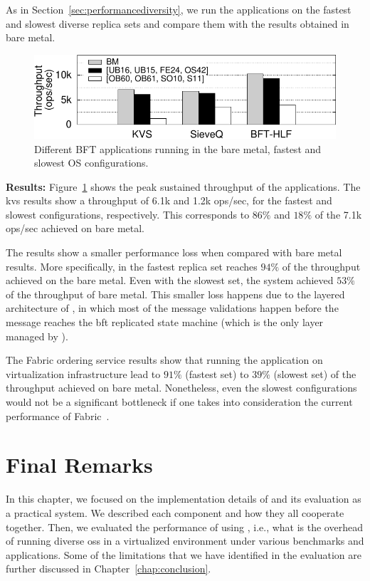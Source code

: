 As in Section~\ref{sec:performancediversity}, we run the applications on the fastest and slowest diverse replica sets and compare them with the results obtained in bare metal.

\begin{figure}[t]
\begin{center}
\includegraphics[width=0.8\columnwidth]{images/gnuplot/vagrant/runs_apps/throughput.pdf}
\caption{Different BFT applications running in the bare metal, fastest and slowest OS configurations.}
\label{fig:apps}
\end{center}
\end{figure}


\textbf{Results:}
Figure~\ref{fig:apps} shows the peak sustained throughput of the applications. 
The \gls{kvs} results show a throughput of 6.1k and 1.2k ops/sec, for the fastest and slowest configurations, respectively.
This corresponds to $86\%$ and $18\%$ of the 7.1k ops/sec achieved on bare metal.

The \sieveq results show a smaller performance loss when compared with bare metal results.
More specifically, \sieveq in the fastest replica set reaches $94\%$ of the throughput achieved on the bare metal.
Even with the slowest set, the system achieved $53\%$ of the throughput of bare metal.
This smaller loss happens due to the layered architecture of \sieveq, in which most of the message validations happen before the message reaches the \gls{bft} replicated state machine (which is the only layer managed by \system).

The Fabric ordering service results show that running the application on \system virtualization infrastructure lead to $91\%$ (fastest set) to $39\%$ (slowest set) of the throughput achieved on bare metal. 
Nonetheless, even the slowest configurations would not be a significant bottleneck if one takes into consideration the current performance of Fabric~\cite{Sousa:2018}.




\section{Final Remarks}
\label{sec:finalremarkslazarus}
In this chapter, we focused on the implementation details of \system and its evaluation as a practical system. 
We described each component and how they all cooperate together. 
Then, we evaluated the performance of using \system, i.e., what is the overhead of running diverse \glspl{os} in a virtualized environment under various benchmarks and applications. 
Some of the limitations that we have identified in the evaluation are further discussed in Chapter~\ref{chap:conclusion}.


